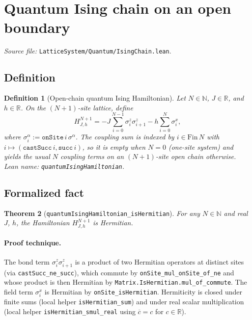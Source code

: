 \documentclass[a4paper,11pt]{article}
\newtheorem{theorem}{Theorem}
\newtheorem{definition}[theorem]{Definition}
\begin{document}
\section{Quantum Ising chain on an open boundary}
\label{sec:ising}

\emph{Source file:} \texttt{LatticeSystem/Quantum/IsingChain.lean}.

\subsection{Definition}

\begin{definition}[Open-chain quantum Ising Hamiltonian]
Let $N \in \mathbb{N}$, $J \in \mathbb{R}$, and $h \in \mathbb{R}$.
On the $(N+1)$-site lattice, define
\[
  H_{J,h}^{N+1}
    = -J \sum_{i=0}^{N-1} \sigma^z_i \sigma^z_{i+1}
      - h \sum_{i=0}^{N} \sigma^x_i,
\]
where $\sigma^\alpha_i := \texttt{onSite}\,i\,\sigma^\alpha$. The
coupling sum is indexed by $i \in \mathrm{Fin}\,N$ with
$i \mapsto (\texttt{castSucc}\,i, \texttt{succ}\,i)$, so it is empty
when $N = 0$ (one-site system) and yields the usual $N$ coupling terms
on an $(N+1)$-site open chain otherwise. Lean name:
\texttt{quantumIsingHamiltonian}.
\end{definition}

\subsection{Formalized fact}

\begin{theorem}[\texttt{quantumIsingHamiltonian\_isHermitian}]
For any $N \in \mathbb{N}$ and real $J$, $h$, the Hamiltonian
$H_{J,h}^{N+1}$ is Hermitian.
\end{theorem}

\paragraph{Proof technique.}
The bond term $\sigma^z_i \sigma^z_{i+1}$ is a product of two Hermitian
operators at distinct sites (via
\texttt{castSucc\_ne\_succ}), which commute by
\texttt{onSite\_mul\_onSite\_of\_ne} and whose product is then
Hermitian by \texttt{Matrix.IsHermitian.mul\_of\_commute}.
The field term $\sigma^x_i$ is Hermitian by
\texttt{onSite\_isHermitian}. Hermiticity is closed under finite sums
(local helper \texttt{isHermitian\_sum}) and under real scalar
multiplication (local helper \texttt{isHermitian\_smul\_real} using
$\overline{c} = c$ for $c \in \mathbb{R}$).
\end{document}
